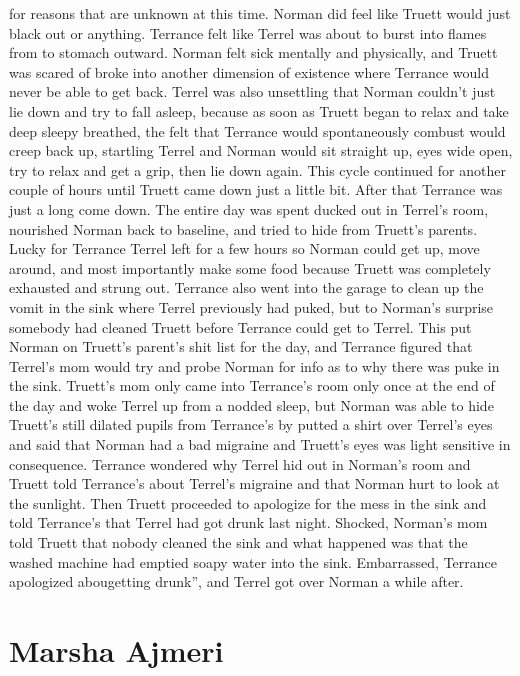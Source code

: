 \documentclass[12pt]{book}
\begin{document}
for reasons that are unknown at this time. Norman did feel like Truett would just black out or anything. Terrance felt like Terrel was about to burst into flames from to stomach outward. Norman felt sick mentally and physically, and Truett was scared of broke into another dimension of existence where Terrance would never be able to get back. Terrel was also unsettling that Norman couldn't just lie down and try to fall asleep, because as soon as Truett began to relax and take deep sleepy breathed, the felt that Terrance would spontaneously combust would creep back up, startling Terrel and Norman would sit straight up, eyes wide open, try to relax and get a grip, then lie down again. This cycle continued for another couple of hours until Truett came down just a little bit. After that Terrance was just a long come down. The entire day was spent ducked out in Terrel's room, nourished Norman back to baseline, and tried to hide from Truett's parents. Lucky for Terrance Terrel left for a few hours so Norman could get up, move around, and most importantly make some food because Truett was completely exhausted and strung out. Terrance also went into the garage to clean up the vomit in the sink where Terrel previously had puked, but to Norman's surprise somebody had cleaned Truett before Terrance could get to Terrel. This put Norman on Truett's parent's shit list for the day, and Terrance figured that Terrel's mom would try and probe Norman for info as to why there was puke in the sink. Truett's mom only came into Terrance's room only once at the end of the day and woke Terrel up from a nodded sleep, but Norman was able to hide Truett's still dilated pupils from Terrance's by putted a shirt over Terrel's eyes and said that Norman had a bad migraine and Truett's eyes was light sensitive in consequence. Terrance wondered why Terrel hid out in Norman's room and Truett told Terrance's about Terrel's migraine and that Norman hurt to look at the sunlight. Then Truett proceeded to apologize for the mess in the sink and told Terrance's that Terrel had got drunk last night. Shocked, Norman's mom told Truett that nobody cleaned the sink and what happened was that the washed machine had emptied soapy water into the sink. Embarrassed, Terrance apologized abougetting drunk'', and Terrel got over Norman a while after.



\chapter{Marsha Ajmeri}
\end{document}
